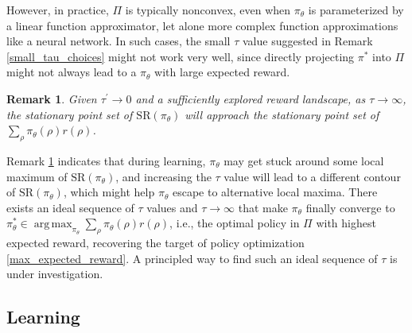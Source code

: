 \documentclass{article}
\DeclareMathOperator*\argmax{arg\,max}
\newcommand{\SR}{\text{SR}}
\newtheorem{remk}{Remark}
\begin{document}
However, in practice, $\Pi$ is typically nonconvex, even when $\pi_\theta$ is parameterized by a linear function approximator, let alone more complex function approximations like a neural network. In such cases, the small $\tau$ value suggested in Remark \ref{small_tau_choices} might not work very well, since directly projecting $\pi^*$ into $\Pi$ might not always lead to a $\pi_\theta$ with large expected reward.

\begin{remk}
	\label{large_tau_choices}
	Given $\tau^{\prime} \to 0$ and a sufficiently explored reward landscape, as $\tau \to \infty$, the stationary point set of $\SR(\pi_\theta)$ will approach the stationary point set of $\sum_{\rho}{ \pi_\theta(\rho) r(\rho) }$.
\end{remk}

Remark \ref{large_tau_choices} indicates that during learning, $\pi_\theta$ may get stuck around some local maximum of $\SR(\pi_\theta)$, and increasing the $\tau$ value will lead to a different contour of $\SR(\pi_\theta)$, which might help $\pi_\theta$ escape to alternative local maxima. There exists an ideal sequence of $\tau$ values and $\tau \to \infty$ that make $\pi_\theta$ finally converge to $\pi_\theta^* \in \argmax_{\pi_\theta}{ \sum_{\rho}{\pi_\theta(\rho) r(\rho)} }$, i.e., the optimal policy in $\Pi$ with highest expected reward, recovering the target of policy optimization \cref{max_expected_reward}. A principled way to find such an ideal sequence of $\tau$ is under investigation.

\subsection{Learning}
\end{document}
